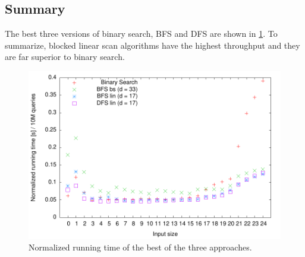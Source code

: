 \subsection{Summary}

The best three versions of binary search, BFS and DFS are shown in \ref{fig:champions}. To summarize, blocked linear scan algorithms have the highest throughput and they are far superior to binary search.

\begin{figure}[h!]

  \centering
  \includegraphics[width=\textwidth]{../week1/plots/outputs/bfs_dfs_16_runningtime}
  \caption{Normalized running time of the best of the three approaches.}
  \label{fig:champions}
\end{figure}
